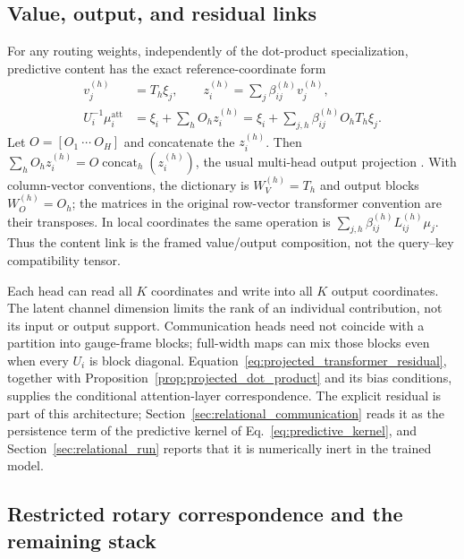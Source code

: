 \documentclass[twoside,11pt]{article}
\begin{document}
\subsection{Value, output, and residual links}
\label{sec:value_aggregation}

For any routing weights, independently of the dot-product specialization, predictive content has the exact reference-coordinate form
\begin{align}
v_j^{(h)}&=T_h\xi_j,\qquad
z_i^{(h)}=\sum_j\beta_{ij}^{(h)}v_j^{(h)},\\
U_i^{-1}\mu_i^{\mathrm{att}}
&=\xi_i+\sum_hO_hz_i^{(h)}
=\xi_i+\sum_{j,h}\beta_{ij}^{(h)}O_hT_h\xi_j.
\label{eq:projected_transformer_residual}
\end{align}
Let $O=[O_1\ \cdots\ O_H]$ and concatenate the $z_i^{(h)}$. Then $\sum_hO_hz_i^{(h)}=O\operatorname{concat}_h(z_i^{(h)})$, the usual multi-head output projection \citep[Sec.~3.2.2]{vaswani2017attention}. With column-vector conventions, the dictionary is $W_V^{(h)}=T_h$ and output blocks $W_O^{(h)}=O_h$; the matrices in the original row-vector transformer convention are their transposes. In local coordinates the same operation is $\sum_{j,h}\beta_{ij}^{(h)}L_{ij}^{(h)}\mu_j$. Thus the content link is the framed value/output composition, not the query--key compatibility tensor.

Each head can read all $K$ coordinates and write into all $K$ output coordinates. The latent channel dimension limits the rank of an individual contribution, not its input or output support. Communication heads need not coincide with a partition into gauge-frame blocks; full-width maps can mix those blocks even when every $U_i$ is block diagonal. Equation~\eqref{eq:projected_transformer_residual}, together with Proposition~\ref{prop:projected_dot_product} and its bias conditions, supplies the conditional attention-layer correspondence. The explicit residual is part of this architecture; Section~\ref{sec:relational_communication} reads it as the persistence term of the predictive kernel of Eq.~\eqref{eq:predictive_kernel}, and Section~\ref{sec:relational_run} reports that it is numerically inert in the trained model.

\subsection{Restricted rotary correspondence and the remaining stack}
\label{sec:rope}
\end{document}
